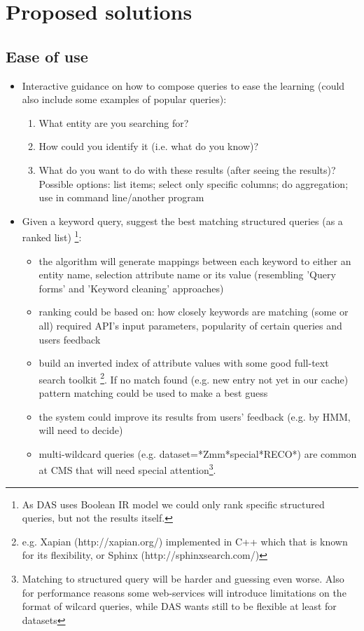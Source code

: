 \section{Proposed solutions}
\subsection{Ease of use}

\begin{itemize}
\item Interactive guidance on how to compose queries to ease the learning (could also include some examples of popular queries):
\begin{enumerate}
\item What entity are you searching for?
\item How could you identify it (i.e. what do you know)?
\item What do you want to do with these results (after seeing the results)? Possible options: list items; select only specific columns; do aggregation; use in command line/another program
\end{enumerate}


\item Given a keyword query, suggest the best matching structured queries (as a ranked list)%
 	\footnote{As DAS uses Boolean IR model we could only rank specific structured queries, but not the results itself.}:
	\begin{itemize}
	\item the algorithm will generate mappings between each keyword to either an entity name, selection attribute name or its value (resembling 'Query forms' and 'Keyword cleaning' approaches)
	\item ranking could be based on: how closely keywords are matching (some or all) required API's input parameters, popularity of certain queries and users feedback	
	\item build an inverted index of attribute values with some good full-text search toolkit%
				\footnote{e.g. Xapian (http://xapian.org/) implemented in C++ which that is known for its flexibility, or Sphinx (http://sphinxsearch.com/)}. 
	If no match found (e.g. new entry not yet in our cache) pattern matching could be used to make a best guess
	\item the system could improve its results from users' feedback (e.g. by HMM, will need to decide)
	\item multi-wildcard queries (e.g. dataset=*Zmm*special*RECO*) are common at CMS that will need special attention\footnote{Matching to structured query will be harder and guessing even worse. Also for performance reasons some web-services will introduce limitations on the format of wilcard queries, while DAS wants still to be flexible at least for datasets}.
	

\end{itemize}
\end{itemize}
